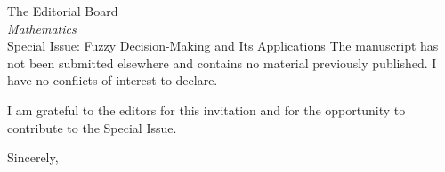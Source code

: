 \documentclass[11pt]{letter}
\begin{document}
\begin{letter}{The Editorial Board\\
\textit{Mathematics}\\
Special Issue: Fuzzy Decision-Making and Its Applications}
The manuscript has not been submitted elsewhere and contains no material previously published. I have no conflicts of interest to declare.

I am grateful to the editors for this invitation and for the opportunity to contribute to the Special Issue.

\closing{Sincerely,}

\end{letter}
\end{document}
